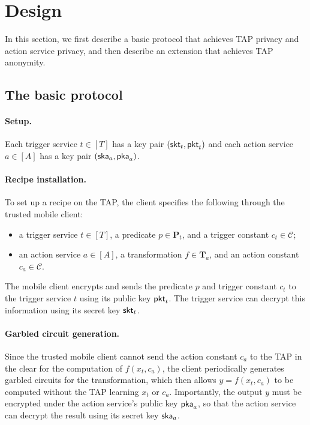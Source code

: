 \section{Design}
\label{sec:design}

In this section, we first describe a basic protocol that achieves TAP privacy
and action service privacy, and then describe an extension that achieves TAP
anonymity.

\subsection{The basic protocol}

\paragraph{Setup.}
Each trigger service $t \in [T]$ has a key pair $(\mathsf{skt}_t, \mathsf{pkt}_t)$ and each
action service $a \in [A]$ has a key pair $(\mathsf{ska}_a, \mathsf{pka}_a)$.

\paragraph{Recipe installation.}
To set up a recipe on the TAP, the client specifies the following through the
trusted mobile client:
\begin{itemize}
  \item a trigger service $t \in [T]$, a predicate $p \in \mathbf{P}_t$, and a
    trigger constant $c_t \in \mathcal{C}$;
  \item an action service $a \in [A]$, a transformation $f \in \mathbf{T}_a$,
    and an action constant $c_a \in \mathcal{C}$.
\end{itemize}
The mobile client encrypts and sends the predicate $p$ and trigger constant
$c_t$ to the trigger service $t$ using its public key $\mathsf{pkt}_t$. The trigger
service can decrypt this information using its secret key $\mathsf{skt}_t$.


\paragraph{Garbled circuit generation.}
Since the trusted mobile client cannot send the action constant $c_a$ to the TAP
in the clear for the computation of $f(x_t, c_a)$, the client periodically
generates garbled circuits for the transformation, which then allows $y = f(x_t,
c_a)$ to be computed without the TAP learning $x_t$ or $c_a$. Importantly, the
output $y$ must be encrypted under the action service's public key $\mathsf{pka}_a$, so
that the action service can decrypt the result using its secret key $\mathsf{ska}_a$.

